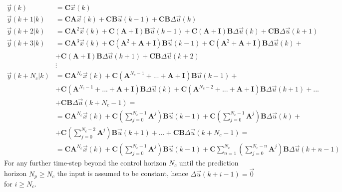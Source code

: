\documentclass[11pt,a4paper,oneside]{book}
\numberwithin{equation}{section}
\theoremstyle{it}
\theoremstyle{definition}
\begin{document}
\begin{equation}\label{eq12}
	\begin{aligned}
		\vec{y}(k) &= \mathbf{C}\vec{x}(k)\\[6pt]
		\vec{y}(k+1|k) &= 
		\mathbf{C}\mathbf{A}\vec{x}(k)+\mathbf{C}\mathbf{B}\vec{u}(k-1) + 
		\mathbf{C}\mathbf{B}\Delta\vec{u}(k)\\[6pt]
		\vec{y}(k+2|k) &= \mathbf{C}\mathbf{A}^2\vec{x}(k)+\mathbf{C}\left( 
		\mathbf{A}+\mathbf{I}\right) \mathbf{B}\vec{u}(k-1) + \mathbf{C}\left( 
		\mathbf{A}+\mathbf{I}\right)\mathbf{B}\Delta\vec{u}(k)+ 
		\mathbf{C}\mathbf{B}\Delta\vec{u}(k+1)\\[6pt]
		\vec{y}(k+3|k) &= \mathbf{C}\mathbf{A}^3\vec{x}(k)+\mathbf{C}\left( 
		\mathbf{A}^2+\mathbf{A}+\mathbf{I}\right) \mathbf{B}\vec{u}(k-1) + 
		\mathbf{C}\left( 
		\mathbf{A}^2+\mathbf{A}+\mathbf{I}\right)\mathbf{B}\Delta\vec{u}(k)+ 
		\\[6pt]
		&+\mathbf{C}\left( 
		\mathbf{A}+\mathbf{I}\right)\mathbf{B}\Delta\vec{u}(k+1)+\mathbf{C}\mathbf{B}\Delta\vec{u}(k+2)\\[6pt]
		&\vdots \\[6pt]
		\vec{y}(k+N_c|k) &= 
		\mathbf{C}\mathbf{A}^{N_c}\vec{x}(k)+\mathbf{C}\left( 
		\mathbf{A}^{N_c-1}+...+\mathbf{A}+\mathbf{I}\right) 
		\mathbf{B}\vec{u}(k-1) + \\[6pt]
		&+\mathbf{C}\left( 
		\mathbf{A}^{N_c-1}+...+\mathbf{A}+\mathbf{I}\right)\mathbf{B}\Delta\vec{u}(k)+
		 \mathbf{C}\left( 
		\mathbf{A}^{N_c-2}+...+\mathbf{A}+\mathbf{I}\right)\mathbf{B}\Delta\vec{u}(k+1)+...\\[6pt]
		&+\mathbf{C}\mathbf{B}\Delta\vec{u}(k+N_c-1) = \\[6pt]
		&=\mathbf{C}\mathbf{A}^{N_c}\vec{x}(k)+\mathbf{C}\left(\sum_{j=0}^{N_c-1}\mathbf{A}^j\right)
		\mathbf{B}\vec{u}(k-1)+\mathbf{C}\left(\sum_{j=0}^{N_c-1}\mathbf{A}^j\right)
		 \mathbf{B}\Delta\vec{u}(k)+\\[6pt]
		&+\mathbf{C}\left(\sum_{j=0}^{N_c-2}\mathbf{A}^j\right) 
		\mathbf{B}\vec{u}(k+1)+...+\mathbf{C}\mathbf{B}\Delta\vec{u}(k+N_c-1) = 
		\\[6pt]
		&=\mathbf{C}\mathbf{A}^{N_c}\vec{x}(k)+\mathbf{C}\left(\sum_{j=0}^{N_c-1}
		 \mathbf{A}^j\right)\mathbf{B}\vec{u}(k-1)+\mathbf{C}\sum_{n=1}^{N_c} 
		\left(\sum_{j=0}^{N_c-n}\mathbf{A}^j\right)\mathbf{B}\Delta\vec{u}(k+n-1)
	\end{aligned}
\end{equation}
For any further time-step beyond the control horizon $N_c$ until the prediction 
horizon $N_p\ge N_c$ the input is assumed to be constant, hence 
$\Delta\vec{u}(k+i-1)=\vec{0}$ for $i\ge N_c$.\\
\end{document}
